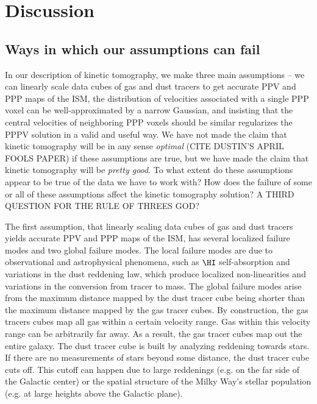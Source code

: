 \section{Discussion}
\label{sec:discussion}

\subsection{Ways in which our assumptions can fail}
\label{sec:discussion-systematics}
In our description of kinetic tomography, we make three main assumptions -- we can linearly scale data cubes of gas and dust tracers to get accurate PPV and PPP maps of the ISM, the distribution of velocities associated with a single PPP voxel can be well-approximated by a narrow Gaussian, and insisting that the central velocities of neighboring PPP voxels should be similar regularizes the PPPV solution in a valid and useful way.
We have not made the claim that kinetic tomography will be in any sense \emph{optimal} (CITE DUSTIN'S APRIL FOOLS PAPER) if these assumptions are true, but we have made the claim that kinetic tomography will be \emph{pretty good}. 
To what extent do these assumptions appear to be true of the data we have to work with?
How does the failure of some or all of these assumptions affect the kinetic tomography solution? 
A THIRD QUESTION FOR THE RULE OF THREES GOD?

The first assumption, that linearly scaling data cubes of gas and dust tracers yields accurate PPV and PPP maps of the ISM, has several localized failure modes and two global failure modes. 
The local failure modes are due to observational and astrophysical phenomena, such as $\HI$ self-absorption and variations in the dust reddening law, which produce localized non-linearities and variations in the conversion from tracer to mass. 
The global failure modes arise from the maximum distance mapped by the dust tracer cube being shorter than the maximum distance mapped by the gas tracer cubes. 
By construction, the gas tracers cubes map all gas within a certain velocity range. 
Gas within this velocity range can be arbitrarily far away. 
As a result, the gas tracer cubes map out the entire galaxy.
The dust tracer cube is built by analyzing reddening towards stars. If there are no measurements of stars beyond some distance, the dust tracer cube cuts off.
This cutoff can happen due to large reddenings (e.g. on the far side of the Galactic center) or the spatial structure of the Milky Way's stellar population (e.g. at large heights above the Galactic plane).

